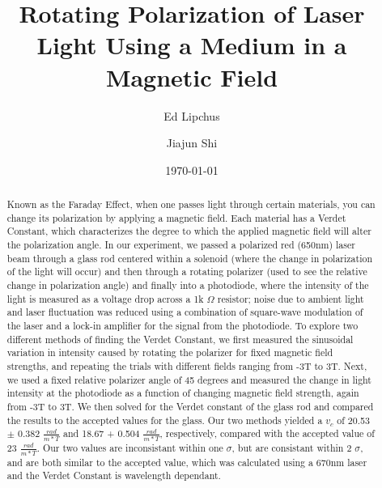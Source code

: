 \documentclass[prb,preprint]{revtex4-1}
\begin{document}
\title{Rotating Polarization of Laser Light Using a Medium in a Magnetic Field}

\author{Ed Lipchus}

\author{Jiajun Shi}

\date{\today}

\begin{abstract}

Known as the Faraday Effect, when one passes light through certain materials, you can change its polarization by applying a magnetic field. Each material has a Verdet Constant, which characterizes the degree to which the applied magnetic field will alter the polarization angle. In our experiment, we passed a polarized red (650nm) laser beam through a glass rod centered within a solenoid (where the change in polarization of the light will occur) and then through a rotating polarizer (used to see the relative change in polarization angle) and finally into a photodiode, where the intensity of the light is measured as a voltage drop across a 1k $\Omega$ resistor; noise due to ambient light and laser fluctuation was reduced using a combination of square-wave modulation of the laser and a lock-in amplifier for the signal from the photodiode. To explore two different methods of finding the Verdet Constant, we first measured the sinusoidal variation in intensity caused by rotating the polarizer for fixed magnetic field strengths, and repeating the trials with different fields ranging from -3T to 3T. Next, we used a fixed relative polarizer angle of 45 degrees and measured the change in light intensity at the photodiode as a function of changing magnetic field strength, again from -3T to 3T. We then solved for the Verdet constant of the glass rod and compared the results to the accepted values for the glass. Our two methods yielded a $v_c$ of 20.53 $\pm$ 0.382 $\frac{rad}{m*T}$ and 18.67 + 0.504 $\frac{rad}{m*T}$, respectively, compared with the accepted value of 23 $\frac{rad}{m*T}$. Our two values are inconsistant within one $\sigma$, but are consistant within 2 $\sigma$, and are both similar to the accepted value, which was calculated using a 670nm laser and the Verdet Constant is wavelength dependant.

\end{abstract}

\maketitle 
\end{document}
